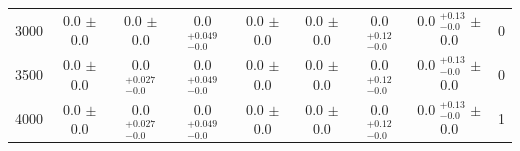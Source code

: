 \begin{table}[H]
\begin{center}
\begin{tabular}{ccccccccc}
            3000  &     0.0 $\pm$ 0.0  &      	 0.0 $\pm$ 0.0  &               0.0 $ _{-0.0}^{+0.049}$  &  0.0 $\pm$ 0.0  &      	 0.0 $\pm$ 0.0  &           0.0 $ _{-0.0}^{+0.12}$   &  0.0 $ _{-0.0}^{+0.13}$   $\pm$ 0.0  &               0 \\
            3500  &     0.0 $\pm$ 0.0  &      	 0.0 $ _{-0.0}^{+0.027}$   &    0.0 $ _{-0.0}^{+0.049}$  &  0.0 $\pm$ 0.0  &      	 0.0 $\pm$ 0.0  &           0.0 $ _{-0.0}^{+0.12}$   &  0.0 $ _{-0.0}^{+0.13}$   $\pm$ 0.0  &               0 \\
            4000  &     0.0 $\pm$ 0.0  &      	 0.0 $ _{-0.0}^{+0.027}$   &    0.0 $ _{-0.0}^{+0.049}$  &  0.0 $\pm$ 0.0  &      	 0.0 $\pm$ 0.0  &           0.0 $ _{-0.0}^{+0.12}$   &  0.0 $ _{-0.0}^{+0.13}$   $\pm$ 0.0  &               1 \\
            \hline \hline
        \end{tabular}
        \label{tab:eventyields2017}
    \end{center}
\end{table}




